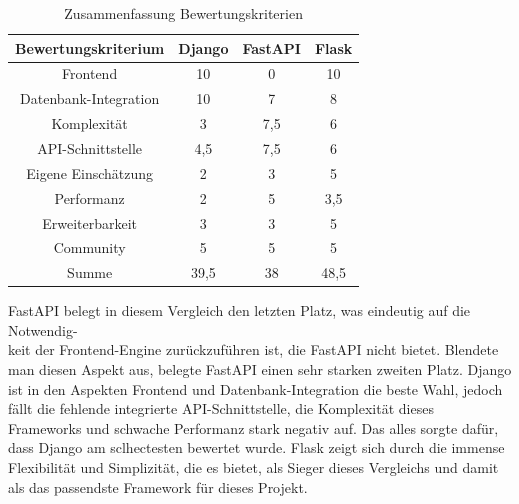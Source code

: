 \documentclass[letterpaper,11pt,leqno]{article}
\begin{document}
\begin{table}[h!]
	\begin{center}
		\begin{tabular}{|c||c|c|c|}
			\hline
			Bewertungskriterium & Django & FastAPI & Flask\\
			\hline\hline
			Frontend & 10 & 0 & 10\\
			Datenbank-Integration & 10 & 7 & 8\\
			Komplexität & 3 & 7,5 & 6\\
			API-Schnittstelle & 4,5 & 7,5 & 6\\
			Eigene Einschätzung & 2 & 3 & 5\\
			Performanz & 2 & 5 & 3,5\\
			Erweiterbarkeit & 3 & 3 & 5\\
			Community & 5 & 5 & 5\\
			\hline
			Summe & 39,5 & 38 & 48,5\\
			\hline
		\end{tabular}
		\caption{Zusammenfassung Bewertungskriterien}
	\end{center}
	\label{table:10}
\end{table}
FastAPI belegt in diesem Vergleich den letzten Platz, was eindeutig auf die Notwendig-\\keit der
Frontend-Engine zurückzuführen ist, die FastAPI nicht bietet. Blendete man diesen Aspekt aus,
belegte FastAPI einen sehr starken zweiten Platz. Django ist in den Aspekten Frontend und
Datenbank-Integration die beste Wahl, jedoch fällt die fehlende integrierte API-Schnittstelle, die
Komplexität dieses Frameworks  und schwache Performanz stark negativ auf. Das alles sorgte dafür,
dass Django am sclhectesten bewertet wurde. Flask zeigt sich durch die immense Flexibilität und
Simplizität, die es bietet, als Sieger dieses Vergleichs und damit als das passendste Framework für
dieses Projekt.
\end{document}
